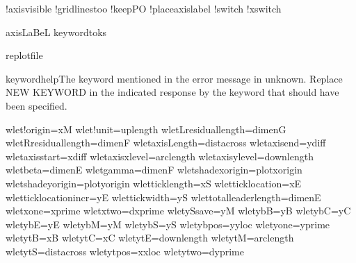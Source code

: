 \newif\if!axisvisible           %
\newif\if!gridlinestoo          %
\newif\if!keepPO                %
\newif\if!placeaxislabel        %
\newif\if!switch                %
\newif\if!xswitch               %

\newtoks\!axisLaBeL             %
\newtoks\!keywordtoks           %

\newwrite\!replotfile           %

\newhelp\!keywordhelp{The keyword mentioned in the error message in unknown.
Replace NEW KEYWORD in the indicated response by the keyword that
should have been specified.}    %

\!wlet\!!origin=\!xM                   %
\!wlet\!!unit=\!uplength               %
\!wlet\!Lresiduallength=\!dimenG       %
\!wlet\!Rresiduallength=\!dimenF       %
\!wlet\!axisLength=\!distacross        %
\!wlet\!axisend=\!ydiff                %
\!wlet\!axisstart=\!xdiff              %
\!wlet\!axisxlevel=\!arclength         %
\!wlet\!axisylevel=\!downlength        %
\!wlet\!beta=\!dimenE                  %
\!wlet\!gamma=\!dimenF                 %
\!wlet\!shadexorigin=\!plotxorigin     %
\!wlet\!shadeyorigin=\!plotyorigin     %
\!wlet\!ticklength=\!xS                %
\!wlet\!ticklocation=\!xE              %
\!wlet\!ticklocationincr=\!yE          %
\!wlet\!tickwidth=\!yS                 %
\!wlet\!totalleaderlength=\!dimenE     %
\!wlet\!xone=\!xprime                  %
\!wlet\!xtwo=\!dxprime                 %
\!wlet\!ySsave=\!yM                    %
\!wlet\!ybB=\!yB                       %
\!wlet\!ybC=\!yC                       %
\!wlet\!ybE=\!yE                       %
\!wlet\!ybM=\!yM                       %
\!wlet\!ybS=\!yS                       %
\!wlet\!ybpos=\!yyloc                  %
\!wlet\!yone=\!yprime                  %
\!wlet\!ytB=\!xB                       %
\!wlet\!ytC=\!xC                       %
\!wlet\!ytE=\!downlength               %
\!wlet\!ytM=\!arclength                %
\!wlet\!ytS=\!distacross               %
\!wlet\!ytpos=\!xxloc                  %
\!wlet\!ytwo=\!dyprime                 %


